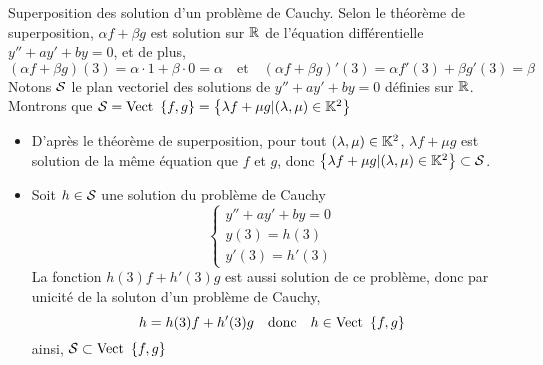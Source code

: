 \documentclass{article}
\date{17 novembre 2024}
\begin{document}
\maketitle

\begin{question_kholle}[{
        Soient $(a,b)\in\C$, $f$ et $g$ les solutions, définies sur $\R$ à valeur dans $\C$ des problèmes de Cauchy suivants
        \[
          \begin{cases}
            y''+ay'+by = 0 \\
            y(3)=1         \\
            y'(3)=0
          \end{cases} \quad \text{et} \quad \begin{cases}
            y''+ay'+by = 0 \\
            y(3)=0         \\
            y'(3)=1
          \end{cases}
        \]
        Comment s’exprime la solution définie sur $\R$ de $\begin{cases}
            y''+ay'+by=0 \\
            y(3)=\alpha  \\
            y'(3)=\beta
          \end{cases}$ pour $(\alpha, \beta)\in\R^{2}$ fixés ?\\
        Peut-on affirmer que le plan vectoriel des solutions définies sur $\R$ à valeur dans $\C$ de l’équation $y''+ay'+by=0$ est $\left\{\lambda\cdot f+\mu\cdot g | (\lambda, \mu)\in\C^{2}\right\}$ ?
      }]{Superposition des solution d’un problème de Cauchy.}
  Selon le théorème de superposition, $\alpha f+\beta g$ est solution sur $\R$ de l'équation différentielle $y''+ay'+by=0$, et de plus,
  \[
    (\alpha f+\beta g)(3) = \alpha\cdot 1+\beta\cdot 0 = \alpha \quad \text{et} \quad (\alpha f+\beta g)'(3) = \alpha f'(3)+\beta g'(3)=\beta
  \]
  Notons $\mathcal S$ le plan vectoriel des solutions de $y''+ay'+by=0$ définies sur $\R$.\\
  Montrons que $\mathcal S=\text{Vect } \left\{f,g\right\} = \left\{\lambda f+ \mu g | (\lambda, \mu)\in\mathbb K^{2}\right\}$
  \begin{itemize}
    \item D’après le théorème de superposition, pour tout $(\lambda, \mu)\in\mathbb K^{2}$, $\lambda f + \mu g$ est solution de la même équation que $f$ et $g$, donc $\left\{\lambda f+\mu g| (\lambda, \mu)\in\mathbb K^{2}\right\}\subset\mathcal S$.
    \item Soit $h\in\mathcal S$ une solution du problème de Cauchy
          \[
            \begin{cases}
              y''+ay'+by = 0 \\
              y(3)=h(3)      \\
              y'(3)=h'(3)
            \end{cases}
          \]
          La fonction $h(3)f+h'(3)g$ est aussi solution de ce problème, donc par unicité de la soluton d’un problème de Cauchy,
          \[
            h = h(3)f+h'(3)g \quad \text{donc} \quad h\in\text{Vect } \left\{f,g\right\}
          \]
          ainsi, $\mathcal S\subset\text{Vect } \left\{f,g\right\}$
  \end{itemize}


\end{question_kholle}
\end{document}
